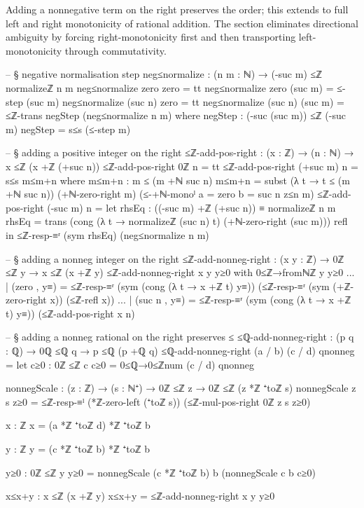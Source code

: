 \documentclass[11pt,a4paper]{book}
\begin{document}
Adding a nonnegative term on the right preserves the order; this extends
to full left and right monotonicity of rational addition.  The section
eliminates directional ambiguity by forcing right-monotonicity first and then
transporting left-monotonicity through commutativity.

\begin{code}
-- § negative normalisation step
neg≤normalize : (n m : ℕ) → (-suc m) ≤ℤ normalizeℤ n m
neg≤normalize zero zero = tt
neg≤normalize zero (suc m) = ≤-step (suc m)
neg≤normalize (suc n) zero = tt
neg≤normalize (suc n) (suc m) =
  ≤ℤ-trans negStep (neg≤normalize n m)
  where
    negStep : (-suc (suc m)) ≤ℤ (-suc m)
    negStep = s≤s (≤-step m)

-- § adding a positive integer on the right
≤ℤ-add-pos-right : (x : ℤ) → (n : ℕ) → x ≤ℤ (x +ℤ (+suc n))
≤ℤ-add-pos-right 0ℤ n = tt
≤ℤ-add-pos-right (+suc m) n = s≤s m≤m+n
  where
    m≤m+n : m ≤ (m +ℕ suc n)
    m≤m+n =
      subst (λ t → t ≤ (m +ℕ suc n))
        (+ℕ-zero-right m)
        (≤-+ℕ-monoˡ {a = zero} {b = suc n} z≤n m)
≤ℤ-add-pos-right (-suc m) n =
  let
    rhsEq : ((-suc m) +ℤ (+suc n)) ≡ normalizeℤ n m
    rhsEq =
      trans
        (cong (λ t → normalizeℤ (suc n) t) (+ℕ-zero-right (suc m)))
        refl
  in
  ≤ℤ-resp-≡ʳ (sym rhsEq) (neg≤normalize n m)

-- § adding a nonneg integer on the right
≤ℤ-add-nonneg-right : (x y : ℤ) → 0ℤ ≤ℤ y → x ≤ℤ (x +ℤ y)
≤ℤ-add-nonneg-right x y y≥0 with 0≤ℤ→fromℕℤ y y≥0
... | (zero , y≡) =
  ≤ℤ-resp-≡ʳ (sym (cong (λ t → x +ℤ t) y≡)) (≤ℤ-resp-≡ʳ (sym (+ℤ-zero-right x)) (≤ℤ-refl x))
... | (suc n , y≡) =
  ≤ℤ-resp-≡ʳ (sym (cong (λ t → x +ℤ t) y≡)) (≤ℤ-add-pos-right x n)

-- § adding a nonneg rational on the right preserves ≤
≤ℚ-add-nonneg-right : (p q : ℚ) → 0ℚ ≤ℚ q → p ≤ℚ (p +ℚ q)
≤ℚ-add-nonneg-right (a / b) (c / d) qnonneg =
  let
    c≥0 : 0ℤ ≤ℤ c
    c≥0 = 0≤ℚ→0≤ℤnum (c / d) qnonneg

    nonnegScale : (z : ℤ) → (s : ℕ⁺) → 0ℤ ≤ℤ z → 0ℤ ≤ℤ (z *ℤ ⁺toℤ s)
    nonnegScale z s z≥0 =
      ≤ℤ-resp-≡ˡ (*ℤ-zero-left (⁺toℤ s))
        (≤ℤ-mul-pos-right 0ℤ z s z≥0)

    x : ℤ
    x = (a *ℤ ⁺toℤ d) *ℤ ⁺toℤ b

    y : ℤ
    y = (c *ℤ ⁺toℤ b) *ℤ ⁺toℤ b

    y≥0 : 0ℤ ≤ℤ y
    y≥0 = nonnegScale (c *ℤ ⁺toℤ b) b (nonnegScale c b c≥0)

    x≤x+y : x ≤ℤ (x +ℤ y)
    x≤x+y = ≤ℤ-add-nonneg-right x y y≥0


\end{code}
\end{document}
